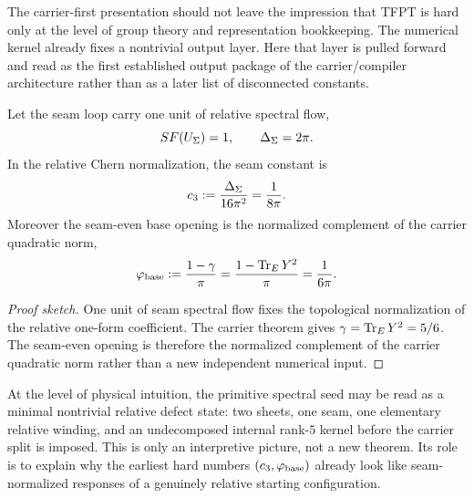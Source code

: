 The carrier-first presentation should not leave the impression that TFPT is hard only at the level of group theory and representation bookkeeping. The numerical kernel already fixes a nontrivial output layer. Here that layer is pulled forward and read as the first established output package of the carrier/compiler architecture rather than as a later list of disconnected constants.

\begin{proposition}
Let the seam loop carry one unit of relative spectral flow,
\[
SF(U_\Sigma)=1,
\qquad
\Delta_\Sigma=2\pi.
\]
In the relative Chern normalization, the seam constant is
\[
c_3:=\frac{\Delta_\Sigma}{16\pi^2}=\frac{1}{8\pi}.
\]
Moreover the seam-even base opening is the normalized complement of the carrier quadratic norm,
\[
\varphi_{\mathrm{base}}
:=
\frac{1-\gamma}{\pi}
=
\frac{1-\operatorname{Tr}_EY^2}{\pi}
=
\frac{1}{6\pi}.
\]
\end{proposition}

\begin{proof}[Proof sketch]
One unit of seam spectral flow fixes the topological normalization of the relative one-form coefficient. The carrier theorem gives $\gamma=\operatorname{Tr}_EY^2=5/6$. The seam-even opening is therefore the normalized complement of the carrier quadratic norm rather than a new independent numerical input.
\end{proof}

\begin{remark}
At the level of physical intuition, the primitive spectral seed may be read as a minimal nontrivial relative defect state: two sheets, one seam, one elementary relative winding, and an undecomposed internal rank-$5$ kernel before the carrier split is imposed. This is only an interpretive picture, not a new theorem. Its role is to explain why the earliest hard numbers $(c_3,\varphi_{\mathrm{base}})$ already look like seam-normalized responses of a genuinely relative starting configuration.
\end{remark}


